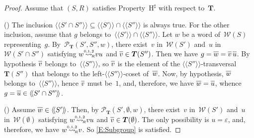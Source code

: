 \documentclass{amsart}
\numberwithin{equation}{section}
\theoremstyle{plain}
\theoremstyle{definition}
\newcounter{ITEM}
\begin{document}
\begin{proof}
Assume that $({S}, {R})$ satisfies Property~${{\mathrm{H}}^\sharp}$ with respect to~${\boldsymbol{T}}$. 

{\setcounter{ITEM}{1}\leavevmode\hbox{\rm()}} The inclusion ${\langle\!\langle{{{S}'\cap {S}''}}\rangle\!\rangle} {\subseteq} {\langle\!\langle{{{S}'}}\rangle\!\rangle}\cap {\langle\!\langle{{{S}''}}\rangle\!\rangle}$ is always true. For the other inclusion, assume that ${g}$ belongs to~${\langle\!\langle{{{S}'}}\rangle\!\rangle}\cap {\langle\!\langle{{{S}''}}\rangle\!\rangle}$. Let ${w}$ be a word of~${\mathcal{W}({S})}$ representing~${g}$. By~${\mathcal{P}}_{\boldsymbol{T}}({S}', {S}'', {w})$, there exist~${v}$ in~${\mathcal{W}({{S}'})}$ and~${u}$ in~${\mathcal{W}({{S}' \cap {S}''})}$ satisfying ${w} {\mathrel{{\mathrel{\overset{\scriptscriptstyle 0,1,2}{\rightsquigarrow}}}_{\hspace{-0.9ex}{\scriptscriptstyle R}}}} {v} {u}$ and ${\overline{\vrule width0pt height5pt{v}}} \in {\boldsymbol{T}}({S}'')$. Then we have ${g} = {\overline{\vrule width0pt height5pt{w}}} = {\overline{\vrule width0pt height5pt{v}}} \, {\overline{\vrule width0pt height5pt{u}}}$. By hypothesis ${\overline{\vrule width0pt height5pt{v}}}$ belongs to~${\langle\!\langle{{{S}''}}\rangle\!\rangle}$, so ${\overline{\vrule width0pt height5pt{v}}}$ is the element of the ${\langle\!\langle{{{S}''}}\rangle\!\rangle}$-transversal~${\boldsymbol{T}}({S}'')$ that belongs to the left-${\langle\!\langle{{{S}''}}\rangle\!\rangle}$-coset of~${\overline{\vrule width0pt height5pt{w}}}$. Now, by hypothesis, ${\overline{\vrule width0pt height5pt{w}}}$ belongs to~${\langle\!\langle{{{S}''}}\rangle\!\rangle}$, hence ${\overline{\vrule width0pt height5pt{v}}}$ must be~$1$, and, therefore, we have ${\overline{\vrule width0pt height5pt{w}}} = {\overline{\vrule width0pt height5pt{u}}}$, whence ${g} = {\overline{\vrule width0pt height5pt{u}}} \in {\langle\!\langle{{{S}' \cap {S}''}}\rangle\!\rangle}$.

{\setcounter{ITEM}{2}\leavevmode\hbox{\rm()}} Assume ${\overline{\vrule width0pt height5pt{w}}} \in {\langle\!\langle{{{S}'}}\rangle\!\rangle}$. Then, by ${\mathcal{P}}_{\boldsymbol{T}}({S}', \emptyset, {w})$, there exist~${v}$ in~${\mathcal{W}({{S}'})}$ and~${u}$ in~${\mathcal{W}(\emptyset)}$ satisfying ${w} {\mathrel{{\mathrel{\overset{\scriptscriptstyle 0,1,2}{\rightsquigarrow}}}_{\hspace{-0.9ex}{\scriptscriptstyle R}}}} {v} {u}$ and ${\overline{\vrule width0pt height5pt{v}}} \in {\boldsymbol{T}}(\emptyset)$. The only possibility is ${u} = {\varepsilon}$, and, therefore, we have ${w} {\mathrel{{\mathrel{\overset{\scriptscriptstyle 0,1,2}{\rightsquigarrow}}}_{\hspace{-0.9ex}{\scriptscriptstyle R}}}} {v}$. So \eqref{E:Subgroup} is satisfied.
\end{proof}
\end{document}
